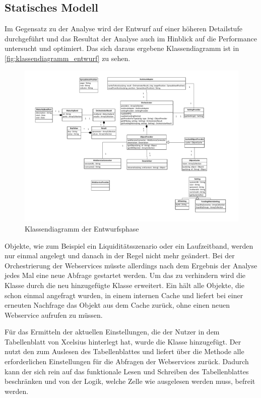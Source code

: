 \begin{onehalfspacing}
\subsection{Statisches Modell}
Im Gegensatz zu der Analyse wird der Entwurf auf einer höheren Detailstufe durchgeführt und das Resultat der Analyse auch im Hinblick auf die Performance untersucht und optimiert. Das sich daraus ergebene Klassendiagramm ist in \vref{fig:klassendiagramm_entwurf} zu sehen.


\begin{figure}[h]
\centering
\setlength{\unitlength}{1mm}
\includegraphics[width=15cm]{Visio/Entwurf.pdf}
\caption{Klassendiagramm der Entwurfsphase\label{fig:klassendiagramm_entwurf}}
\end{figure} 

Objekte, wie zum Beispiel ein Liquiditätsszenario oder ein Laufzeitband, werden nur einmal angelegt und danach in der Regel nicht mehr geändert. Bei der Orchestrierung der Webservices müsste allerdings nach dem Ergebnis der Analyse jedes Mal eine neue Abfrage gestartet werden. Um das zu verhindern wird die Klasse  durch die neu hinzugefügte Klasse  erweitert. Ein  hält alle Objekte, die schon einmal angefragt wurden, in einem internen Cache und liefert bei einer erneuten Nachfrage das Objekt aus dem Cache zurück, ohne einen neuen Webservice aufrufen zu müssen.

Für das Ermitteln der aktuellen Einstellungen, die der Nutzer in dem Tabellenblatt von \gls{Xcelsius} hinterlegt hat, wurde die Klasse  hinzugefügt. Der  nutzt den  zum Auslesen des Tabellenblattes und liefert über die Methode  alle erforderlichen Einstellungen für die Abfragen der Webservices zurück. Dadurch kann der  sich rein auf das funktionale Lesen und Schreiben des Tabellenblattes beschränken und von der Logik, welche Zelle wie ausgelesen werden muss, befreit werden.


\end{onehalfspacing}

